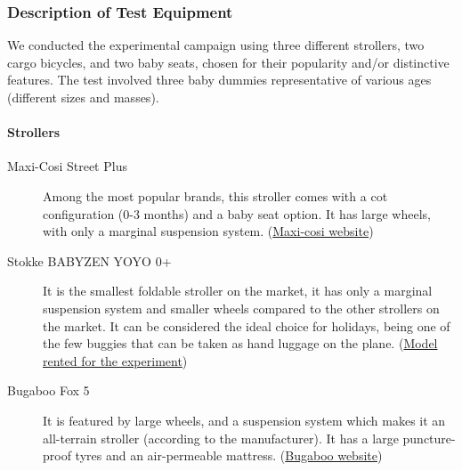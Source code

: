 \documentclass[a4paper]{article}
\begin{document}
\subsubsection{Description of Test Equipment}
%
We conducted the experimental campaign using three different strollers, two
cargo bicycles, and two baby seats, chosen for their popularity and/or
distinctive features. The test involved three baby dummies representative of
various ages (different sizes and masses).

\paragraph{Strollers}
%
\begin{description}
  \item[Maxi-Cosi Street Plus] Among the most popular brands, this stroller comes
  with a cot configuration (0-3 months) and a baby seat option. It has large
  wheels, with only a marginal suspension system.
  (\href{https://www.maxi-cosi.nl/kinderwagens/street-plus?color_swatch_id=5519}{Maxi-cosi website})
  \item[Stokke BABYZEN YOYO 0+] It is the smallest foldable stroller on the
  market, it has only a marginal suspension system and smaller wheels compared
  to the other strollers on the market. It can be considered the ideal choice
  for holidays, being one of the few buggies that can be taken as hand
  luggage on the plane.
  (\href{https://tinylibrary.nl/products/kinderwagen-babyzen-yoyo-0-plus}{Model
  rented for the experiment})
  \item[Bugaboo Fox 5] It is featured by large wheels, and a suspension system
  which makes it an all-terrain stroller (according to the manufacturer). It has
  a large puncture-proof tyres and an air-permeable mattress.
  (\href{https://www.bugaboo.com/nl-nl/speciale-aanbiedingen/bugaboo-fox-5-bassinet-and-seat-stroller-black-base-midnight-black-fabrics-midnight-black-sun-canopy-PV006272.html?gad_source=1&gclid=Cj0KCQiA1Km7BhC9ARIsAFZfEIuB-6fQPRl5KyIHVJtion5lyD_Z1Qn-IP3shWoB_HXFozM1ySTXNfgaAgzFEALw_wcB&gclsrc=aw.ds}{Bugaboo
  website})
\end{description}
\end{document}
